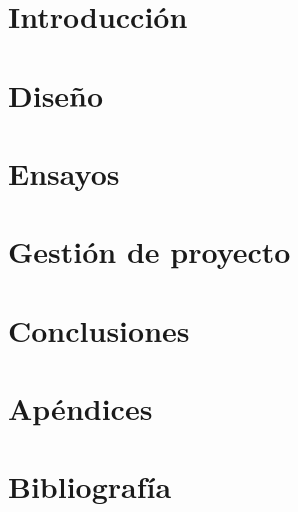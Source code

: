 \documentclass[12pt,oneside,final]{rf2}
\begin{document}





\newpage
{}

\tableofcontents

\listoffigures

\listoftables
\newpage



\startarabicpagination
\part{Introducción}


\part{Diseño}




\part{Ensayos}


\part{Gestión de proyecto}



\part{Conclusiones}


\part{Apéndices}
\appendix






\part{Bibliografía}


\end{document}
